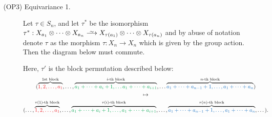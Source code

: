 \begin{definition}
\begin{description}
    \item[(OP3) Equivariance 1.]
    Let $\tau \in S_n$, 
    and let $\tau^*$ be the isomorphism $\tau^*: X_{a_1} \otimes \cdots \otimes X_{a_n}
    \isomarrow X_{\tau(a_1)} \otimes \cdots \otimes X_{\tau(a_n)}$ and by abuse of notation 
    denote $\tau$ as the morphism $\tau: X_n \to X_n$ which is given by the group action. 
    Then the diagram below must commute.
    \begin{center}
    \end{center}
    Here, $\tau'$ is the block permutation described below:
    \begin{gather*}
        (\overbrace{\textcolor{Red}{1, 2, \dots, a_1}}^{\text{1st block}}, \dots, 
        \overbrace{\textcolor{Green}{a_1 + \cdots + a_i+1, \dots a_1 + \cdots + a_{i+1}}}^{i\text{-th block}}, \dots
        \overbrace{\textcolor{RoyalBlue}{a_1 + \cdots + a_{n-1}+ 1, \dots, a_1 + \cdots + a_n}}^{n\text{-th block}})\\
        \mapsto\\
        (\dots, \overbrace{\textcolor{Red}{1, 2, \dots, a_1}}^{\tau(1)\text{-th block}}, \dots 
        ,  \overbrace{\textcolor{Green}{a_1 + \cdots + a_i+1, \dots, a_1 + \cdots + a_{i+1}}}^{\tau(i)\text{-th block}}, \dots
        ,  \overbrace{\textcolor{RoyalBlue}{a_1 + \cdots +  a_{n-1}+1, \dots, a_1 + \cdots + a_{n}}}^{\tau(n)\text{-th block}}, \dots
        ).
    \end{gather*}


\end{description}
\end{definition}
